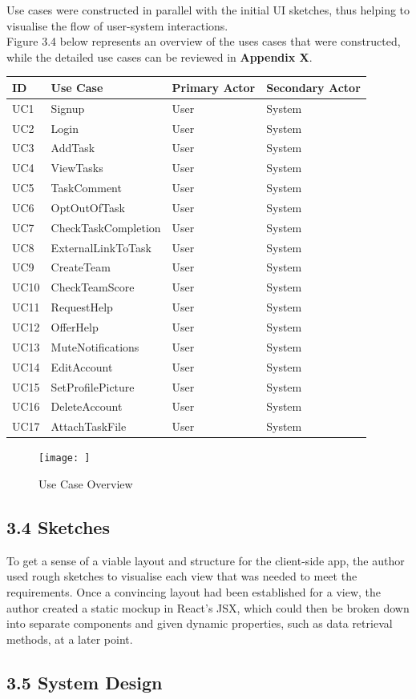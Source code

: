 \documentclass[12pt]{report}
\begin{document}
Use cases were constructed in parallel with the initial UI sketches,
thus helping to visualise the flow of user-system interactions.\\
Figure 3.4 below represents an overview of the uses cases that
were constructed, while the detailed use cases can be reviewed in
\textbf{Appendix X}.

\begin{longtable}[]{@{}llll@{}}
\toprule
ID & Use Case & Primary Actor & Secondary Actor\tabularnewline
\midrule
\endhead
UC1 & Signup & User & System\tabularnewline
UC2 & Login & User & System\tabularnewline
UC3 & AddTask & User & System\tabularnewline
UC4 & ViewTasks & User & System\tabularnewline
UC5 & TaskComment & User & System\tabularnewline
UC6 & OptOutOfTask & User & System\tabularnewline
UC7 & CheckTaskCompletion & User & System\tabularnewline
UC8 & ExternalLinkToTask & User & System\tabularnewline
UC9 & CreateTeam & User & System\tabularnewline
UC10 & CheckTeamScore & User & System\tabularnewline
UC11 & RequestHelp & User & System\tabularnewline
UC12 & OfferHelp & User & System\tabularnewline
UC13 & MuteNotifications & User & System\tabularnewline
UC14 & EditAccount & User & System\tabularnewline
UC15 & SetProfilePicture & User & System\tabularnewline
UC16 & DeleteAccount & User & System\tabularnewline
UC17 & AttachTaskFile & User & System\tabularnewline
\bottomrule
\end{longtable}

\begin{figure}[htbp]
\centering
\texttt{[image: ]}
\caption{Use Case Overview}
\end{figure}

\subsection{3.4 Sketches}\label{sketches}

To get a sense of a viable layout and structure for the client-side app,
the author used rough sketches to visualise each view that was needed to
meet the requirements. Once a convincing layout had been established for
a view, the author created a static mockup in React's JSX, which could
then be broken down into separate components and given dynamic
properties, such as data retrieval methods, at a later point.

\subsection{3.5 System Design}\label{system-design}
\end{document}

